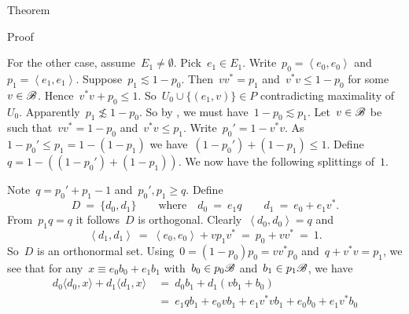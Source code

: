 \documentclass[b]{subfiles}
\begin{document}
\begin{parsec}
\begin{point}{Theorem}
\begin{point}{Proof}
\begin{point}
For the other case, assume~$E_1 \neq \emptyset$.
Pick~$e_1 \in E_1$.
Write~$p_0 = \left<e_0,e_0\right>$
    and~$p_1 = \left<e_1,e_1\right>$.
Suppose~$p_1 \lesssim 1 - p_0$.
Then~$vv^* = p_1$ and~$v^*v \leq 1- p_0$ for some~$v \in \mathscr{B}$.
    Hence~$v^*v + p_0 \leq 1$.
    So~$U_0 \cup \{ (e_1, v) \} \in P$ contradicting maximality of~$U_0$.
Apparently~$p_1 \not\lesssim 1-p_0$.
So by , we must have~$1-p_0 \lesssim p_1$.
Let~$v \in \mathscr{B}$ be such that~$vv^*=1-p_0$
    and~$v^*v \leq p_1$.
Write~$p_0' = 1- v^*v$.
As~$1-p_0' \leq p_1 =1-(1-p_1)$
we have~$(1-p_0') + (1-p_1) \leq 1$.
Define~$q = 1- ((1-p_0') + (1-p_1))$.
We now have the following splittings of~$1$.
\begin{center}
\end{center}
Note~$q = p_0'+p_1 - 1$ and~$p_0', p_1 \geq q$.
Define
\begin{equation*}
    D \ = \ \{d_0, d_1\} \qquad \text{where} \quad
    d_0 \ =\   e_1 q \qquad
    d_1 \ = \ e_0 + e_1v^*.
\end{equation*}
From~$p_1q=q$ it follows~$D$ is orthogonal.
Clearly~$\left<d_0,d_0\right>=q$ and
\begin{equation*}
    \left<d_1, d_1\right>
        \ =\ \left<e_0, e_0\right> + vp_1v^*    
        \ =\ p_0 + vv^* \ =\ 1.
\end{equation*}
So~$D$ is an orthonormal set.
Using~$0 = (1-p_0)p_0 = vv^*p_0 $ and~$q+v^*v = p_1$, we see
that for any~$x \equiv e_0 b_0 + e_1 b_1$
with~$b_0 \in p_0\mathscr{B}$ and~$b_1 \in p_1 \mathscr{B}$, we have
\begin{align*}
    d_0 \langle d_0, x \rangle + d_1 \langle d_1 , x \rangle
    &\ = \ d_0 b_1 + d_1(vb_1 + b_0) \\
    &\ = \ e_1 q b_1 + e_0 vb_1 + e_1v^*vb_1 + e_0 b_0 + e_1v^* b_0 \\

\end{align*}
\end{point}
\end{point}
\end{point}
\end{parsec}
\end{document}
